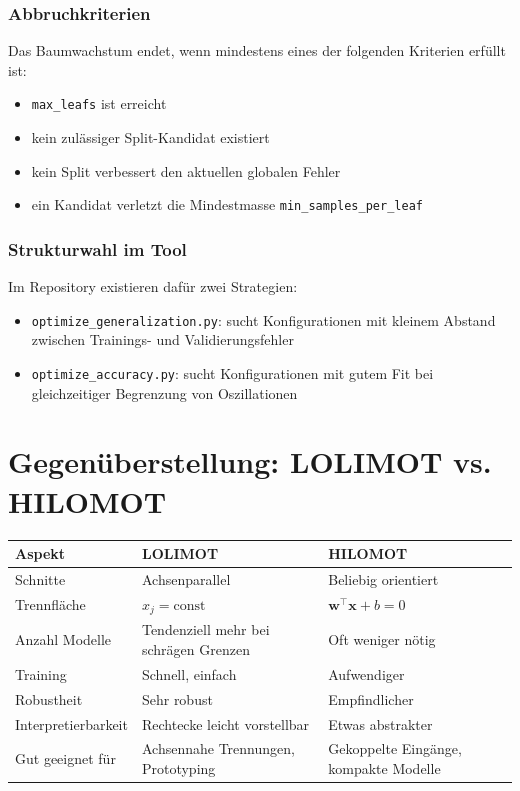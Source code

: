 \documentclass[11pt,a4paper]{report}
\begin{document}
	\subsubsection*{Abbruchkriterien}
	
	Das Baumwachstum endet, wenn mindestens eines der folgenden Kriterien erfüllt ist:
	\begin{itemize}
		\item \texttt{max\_leafs} ist erreicht
		\item kein zulässiger Split-Kandidat existiert
		\item kein Split verbessert den aktuellen globalen Fehler
		\item ein Kandidat verletzt die Mindestmasse \texttt{min\_samples\_per\_leaf}
	\end{itemize}
	
	\subsubsection*{Strukturwahl im Tool}
	
	Im Repository existieren dafür zwei Strategien:
	\begin{itemize}
		\item \texttt{optimize\_generalization.py}: sucht Konfigurationen mit kleinem Abstand zwischen Trainings- und Validierungsfehler
		\item \texttt{optimize\_accuracy.py}: sucht Konfigurationen mit gutem Fit bei gleichzeitiger Begrenzung von Oszillationen
	\end{itemize}
	
	\section{Gegenüberstellung: LOLIMOT vs. HILOMOT}
	
	\begin{center}
		\begin{tabular}{p{3.5cm}p{4.5cm}p{4.5cm}}
			\toprule
			\textbf{Aspekt} & \textbf{LOLIMOT} & \textbf{HILOMOT} \\
			\midrule
			Schnitte & Achsenparallel & Beliebig orientiert \\
			Trennfläche & $x_j = \mathrm{const}$ & $\mathbf{w}^\top \mathbf{x} + b = 0$ \\
			Anzahl Modelle & Tendenziell mehr bei schrägen Grenzen & Oft weniger nötig \\
			Training & Schnell, einfach & Aufwendiger \\
			Robustheit & Sehr robust & Empfindlicher \\
			Interpretierbarkeit & Rechtecke leicht vorstellbar & Etwas abstrakter \\
			Gut geeignet für & Achsennahe Trennungen, Prototyping & Gekoppelte Eingänge, kompakte Modelle \\
			\bottomrule
		\end{tabular}
	\end{center}
	
\end{document}
